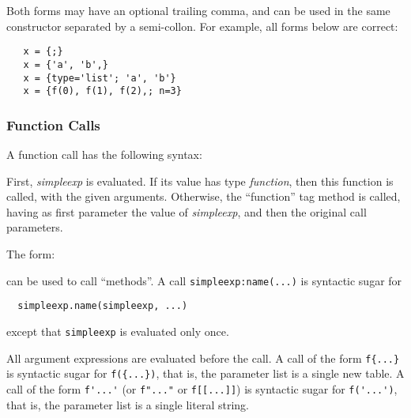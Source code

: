\documentclass[11pt]{article}
\newcommand{\M}[1]{\emph{#1}}
\newcommand{\Index}[1]{#1\index{#1}}
\begin{document}
Both forms may have an optional trailing comma,
and can be used in the same constructor separated by
a semi-collon.
For example, all forms below are correct:
\begin{verbatim}
   x = {;}
   x = {'a', 'b',}
   x = {type='list'; 'a', 'b'}
   x = {f(0), f(1), f(2),; n=3}
\end{verbatim}

\subsubsection{Function Calls}  \label{functioncall}
A \Index{function call} has the following syntax:
\begin{Produc}
\end{Produc}%
First, \M{simpleexp} is evaluated.
If its value has type \emph{function},
then this function is called,
with the given arguments.
Otherwise, the ``function'' tag method is called,
having as first parameter the value of \M{simpleexp},
and then the original call parameters.

The form:
\begin{Produc}
\end{Produc}%
can be used to call ``methods''.
A call \verb|simpleexp:name(...)|
is syntactic sugar for
\begin{verbatim}
  simpleexp.name(simpleexp, ...)
\end{verbatim}
except that \verb|simpleexp| is evaluated only once.

\begin{Produc}
\end{Produc}%
All argument expressions are evaluated before the call.
A call of the form \verb|f{...}| is syntactic sugar for
\verb|f({...})|, that is,
the parameter list is a single new table.
A call of the form \verb|f'...'|
(or \verb|f"..."| or \verb|f[[...]]|) is syntactic sugar for
\verb|f('...')|, that is,
the parameter list is a single literal string.
\end{document}

